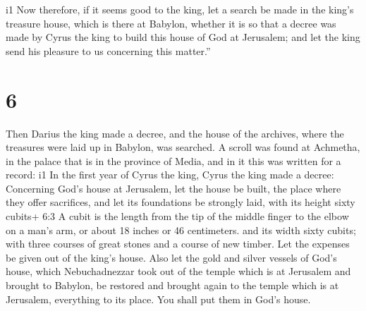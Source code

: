 i1 Now therefore, if it seems good to the king, let a
search be made in the king's treasure house, which is there at Babylon,
whether it is so that a decree was made by Cyrus the king to build this
house of God at Jerusalem; and let the king send his pleasure to us
concerning this matter.''

\hypertarget{section-5}{%
\section{6}\label{section-5}}

 Then Darius the king made a decree, and the house of the
archives, where the treasures were laid up in Babylon, was searched.
 A scroll was found at Achmetha, in the palace that is in
the province of Media, and in it this was written for a record:
i1 In the first year of Cyrus the king, Cyrus the king made
a decree: Concerning God's house at Jerusalem, let the house be built,
the place where they offer sacrifices, and let its foundations be
strongly laid, with its height sixty cubits+ 6:3 A cubit is the length
from the tip of the middle finger to the elbow on a man's arm, or about
18 inches or 46 centimeters. and its width sixty cubits; 
with three courses of great stones and a course of new timber. Let the
expenses be given out of the king's house.  Also let the
gold and silver vessels of God's house, which Nebuchadnezzar took out of
the temple which is at Jerusalem and brought to Babylon, be restored and
brought again to the temple which is at Jerusalem, everything to its
place. You shall put them in God's house.

